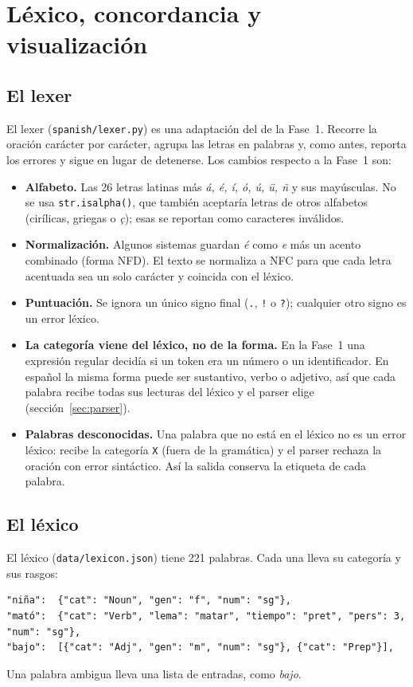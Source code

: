 \section{Léxico, concordancia y visualización}
\label{sec:lexer_concordancia_arboles}

\subsection{El lexer}

El lexer (\texttt{spanish/lexer.py}) es una adaptación del de la Fase~1. Recorre la oración
carácter por carácter, agrupa las letras en palabras y, como antes, reporta los errores y sigue
en lugar de detenerse. Los cambios respecto a la Fase~1 son:
\begin{itemize}
  \item \textbf{Alfabeto.} Las 26 letras latinas más \emph{á, é, í, ó, ú, ü, ñ} y sus mayúsculas.
    No se usa \texttt{str.isalpha()}, que también aceptaría letras de otros alfabetos
    (cirílicas, griegas o \emph{ç}); esas se reportan como caracteres inválidos.
  \item \textbf{Normalización.} Algunos sistemas guardan \emph{é} como \emph{e} más un acento
    combinado (forma NFD). El texto se normaliza a NFC para que cada letra acentuada sea un solo
    carácter y coincida con el léxico.
  \item \textbf{Puntuación.} Se ignora un único signo final (\texttt{.}, \texttt{!} o
    \texttt{?}); cualquier otro signo es un error léxico.
  \item \textbf{La categoría viene del léxico, no de la forma.} En la Fase~1 una expresión regular
    decidía si un token era un número o un identificador. En español la misma forma puede ser
    sustantivo, verbo o adjetivo, así que cada palabra recibe todas sus lecturas del léxico y el
    parser elige (sección~\ref{sec:parser}).
  \item \textbf{Palabras desconocidas.} Una palabra que no está en el léxico no es un error
    léxico: recibe la categoría \texttt{X} (fuera de la gramática) y el parser rechaza la oración
    con error sintáctico. Así la salida conserva la etiqueta de cada palabra.
\end{itemize}

\subsection{El léxico}

El léxico (\texttt{data/lexicon.json}) tiene 221 palabras. Cada una lleva su categoría y sus
rasgos:
\begin{lstlisting}
"niña":  {"cat": "Noun", "gen": "f", "num": "sg"},
"mató":  {"cat": "Verb", "lema": "matar", "tiempo": "pret", "pers": 3, "num": "sg"},
"bajo":  [{"cat": "Adj", "gen": "m", "num": "sg"}, {"cat": "Prep"}],
\end{lstlisting}
Una palabra ambigua lleva una lista de entradas, como \emph{bajo}.

